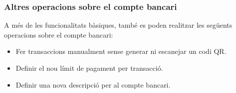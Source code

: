 \documentclass[a4paper,12pt,twoside]{ThesisStyle}
\begin{document}
\clearpage

\subsubsection{Altres operacions sobre el compte bancari}
\label{subsubsec:Altres operacions sobre el compte bancari}


A més de les funcionalitats bàsiques, també es poden realitzar les següents operacions sobre el compte bancari:

\begin{itemize} 
    \item Fer transaccions manualment sense generar ni escanejar un codi QR. 
    \item Definir el nou límit de pagament per transacció. 
    \item Definir una nova descripció per al compte bancari.
\end{itemize}
\end{document}
